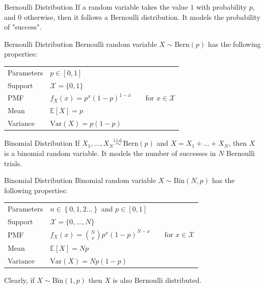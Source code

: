 \documentclass[10pt]{beamer}
\begin{document}
\begin{frame}[fragile]{Bernoulli Distribution}
If a random variable takes the value \(1\) with probability \(p\), and \(0\) otherwise, then it follows a Bernoulli distribution. It models the probability of "success".

\begin{alertblock}{Bernoulli Distribution}
Bernoulli random variable \(X \sim \textrm{Bern}\left(p\right)\) has the following properties:
  \begin{table}
    \begin{tabular}{ll}
      \toprule
      Parameters & \(p \in \left[0,1\right]\)\\
      Support & \(\mathcal{X} = \{0,1\}\)\\
      PMF & \(f_X\left(x\right) = p^x\left(1 - p\right)^{1 - x}\qquad\textrm{for }x \in \mathcal{X}\)\\
      Mean & \(\mathbb{E}\left[X\right] = p\)\\
      Variance & \(\textrm{Var}\left(X\right) = p\left(1 - p\right)\)\\
      \bottomrule
    \end{tabular}
  \end{table}
\end{alertblock}
\end{frame}

\begin{frame}[fragile]{Binomial Distribution}
If \(X_1, \dots, X_N \overset{\textrm{i.i.d.}}{\sim} \textrm{Bern}\left(p\right)\) and \(X = X_1 + \dots + X_N\), then \(X\) is a binomial random variable. It models the number of successes in \(N\) Bernoulli trials.

\begin{alertblock}{Binomial Distribution}
Binomial random variable \(X \sim \textrm{Bin}\left(N, p\right)\) has the following properties:
  \begin{table}
    \begin{tabular}{ll}
      \toprule
      Parameters & \(n \in \left\{0, 1, 2 \dots\right\}\) and \(p \in \left[0,1\right]\)\\
      Support & \(\mathcal{X} = \{0,\dots, N\}\)\\
      PMF & \(f_X\left(x\right) = \binom{N}{x}p^x\left(1 - p\right)^{N - x}\qquad\textrm{for }x \in \mathcal{X}\)\\
      Mean & \(\mathbb{E}\left[X\right] = Np\)\\
      Variance & \(\textrm{Var}\left(X\right) = Np\left(1 - p\right)\)\\
      \bottomrule
    \end{tabular}
  \end{table}
\end{alertblock}

Clearly, if \(X \sim \textrm{Bin}\left(1, p\right)\) then \(X\) is also Bernoulli distributed.
\end{frame}
\end{document}

